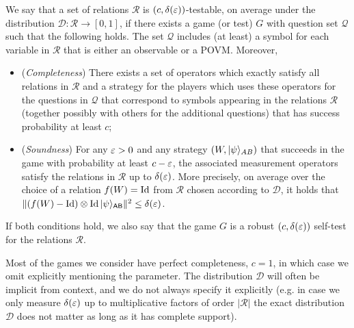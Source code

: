 \begin{definition}
We say that a set of relations $\mathcal{R}$ is $(c,\delta(\varepsilon))$-testable, on average under the distribution $\mathcal{D}:\mathcal{R}\to[0,1]$, if
  there exists a game (or test) $G$ with question set $\mathcal{Q}$ such that the following holds. The set $\mathcal{Q}$ includes (at least) a symbol for each variable in $\mathcal{R}$ that is either
  an observable or a POVM. Moreover,
\begin{itemize}
\item (\emph{Completeness}) There exists a set of operators which exactly satisfy all relations in $\mathcal{R}$ and a strategy for the players which uses these operators for the questions in $\mathcal{Q}$ that correspond to symbols appearing in the relations $\mathcal{R}$ (together possibly with others for the additional questions) that has success probability at least $c$;
\item (\emph{Soundness}) For any $\varepsilon>0$ and any strategy $(W,|\psi\rangle_{AB})$ that succeeds in the game with probability at least $c-\varepsilon$, the associated measurement operators satisfy the relations in $\mathcal{R}$ up to $\delta(\varepsilon)$. More precisely, on average
 over the choice of a relation $f(W)=\mathop{\rm Id}\nolimits$ from $\mathcal{R}$ chosen according to $\mathcal{D}$, it holds that $\|  (f(W)-\mathop{\rm Id}\nolimits)\otimes\mathop{\rm Id}\nolimits |\psi\rangle_{{\textsf{AB}}}\|^2 \leq \delta(\varepsilon)$.
\end{itemize}
If both conditions hold, we also say that the game $G$ is a robust $(c,\delta(\varepsilon))$ self-test for the relations $\mathcal{R}$. 
\end{definition}

Most of the games we consider have perfect completeness, $c=1$, in which case we  omit explicitly mentioning the parameter. 
 The distribution $\mathcal{D}$ will often be implicit from context, and we do not always specify it explicitly (e.g. in case we only measure $\delta(\varepsilon)$ up to multiplicative factors of order $|\mathcal{R}|$ the exact distribution $\mathcal{D}$ does not matter as long as it has complete support). 

